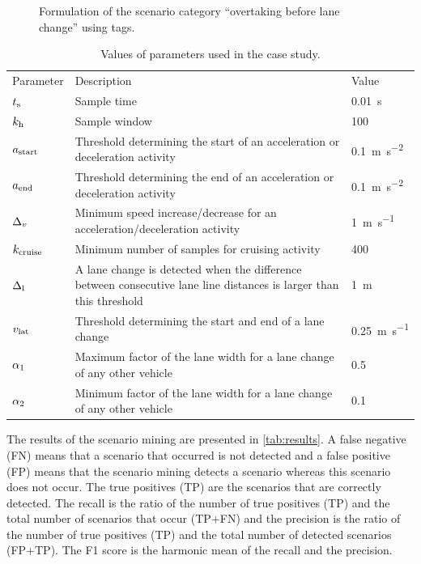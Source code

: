 \begin{figure}
	\centering
	
	\caption{\cstartd Formulation of the scenario category ``overtaking before lane change'' using tags.\cendd}
	\label{fig:overtaking template}
\end{figure}

\begin{table}
	\centering
	\caption{\cstartc Values of parameters used in the case study. \cendc}
	\label{tab:parameters}
	\cstartc
	\begin{tabularx}{\linewidth}{lXl}
		\toprule
		Parameter & Description & Value \\ \otoprule
		$t_\mathrm{s}$ & Sample time & \SI{0.01}{\second} \\
		$k_{\mathrm{h}}$ & Sample window & 100 \\
		$a_\mathrm{start}$ & Threshold determining the start of an acceleration or deceleration activity & \SI{0.1}{\meter\per\second\squared} \\
		$a_\mathrm{end}$ & Threshold determining the end of an acceleration or deceleration activity & \SI{0.1}{\meter\per\second\squared} \\
		$\Delta_{v}$ & Minimum speed increase/decrease for an acceleration/deceleration activity & \SI{1}{\meter\per\second} \\
		$k_\mathrm{cruise}$ & Minimum number of samples for cruising activity & 400 \\
		$\Delta_{\mathrm{l}}$ & A lane change is detected when the difference between consecutive lane line distances is larger than this threshold & \SI{1}{\meter} \\
		$v_{\mathrm{lat}}$ & Threshold determining the start and end of a lane change & \SI{0.25}{\meter\per\second} \\
		$\alpha_1$ & Maximum factor of the lane width for a lane change of any other vehicle & 0.5 \\
		$\alpha_2$ & Minimum factor of the lane width for a lane change of any other vehicle & 0.1 \\
		\bottomrule
	\end{tabularx}
	\cendc
\end{table}

\cstartd The results of the scenario mining are presented in \cref{tab:results}.
A false negative (FN) means that a scenario that occurred is not detected and a false positive (FP) means that the scenario mining detects a scenario whereas this scenario does not occur.
The true positives (TP) are the scenarios that are correctly detected.
The recall is the ratio of the number of true positives (TP) and the total number of scenarios that occur (TP+FN) and the precision is the ratio of the number of true positives (TP) and the total number of detected scenarios (FP+TP).
The F1 score is the harmonic mean of the recall and the precision.
\cendd

